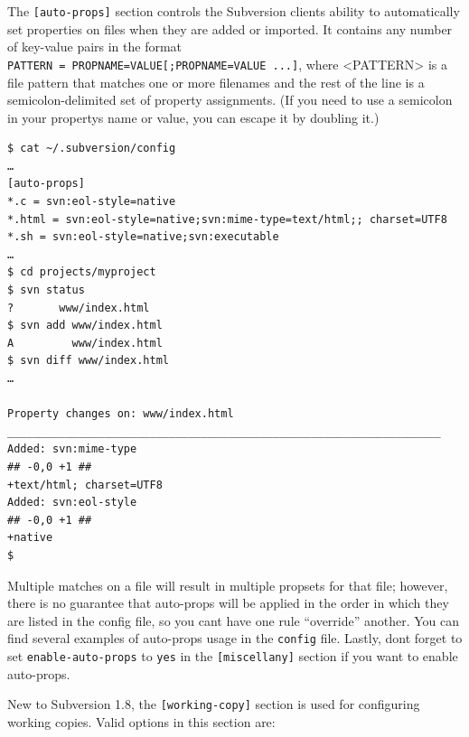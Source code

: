 The \texttt{{[}auto-props{]}} section controls the Subversion
client\textquotesingle s ability to automatically set properties on
files when they are added or imported. It contains any number of
key-value pairs in the format
\texttt{PATTERN\ =\ PROPNAME=VALUE{[};PROPNAME=VALUE\ ...{]}}, where
\textless PATTERN\textgreater{} is a file pattern that matches one or
more filenames and the rest of the line is a semicolon-delimited set of
property assignments. (If you need to use a semicolon in your
property\textquotesingle s name or value, you can escape it by doubling
it.)

\begin{verbatim}
$ cat ~/.subversion/config
…
[auto-props]
*.c = svn:eol-style=native
*.html = svn:eol-style=native;svn:mime-type=text/html;; charset=UTF8
*.sh = svn:eol-style=native;svn:executable
…
$ cd projects/myproject
$ svn status
?       www/index.html
$ svn add www/index.html
A         www/index.html
$ svn diff www/index.html
…

Property changes on: www/index.html
___________________________________________________________________
Added: svn:mime-type
## -0,0 +1 ##
+text/html; charset=UTF8
Added: svn:eol-style
## -0,0 +1 ##
+native
$
\end{verbatim}

Multiple matches on a file will result in multiple propsets for that
file; however, there is no guarantee that auto-props will be applied in
the order in which they are listed in the config file, so you
can\textquotesingle t have one rule ``override'' another. You can find
several examples of auto-props usage in the \texttt{config} file.
Lastly, don\textquotesingle t forget to set \texttt{enable-auto-props}
to \texttt{yes} in the \texttt{{[}miscellany{]}} section if you want to
enable auto-props.

New to Subversion 1.8, the \texttt{{[}working-copy{]}} section is used
for configuring working copies. Valid options in this section are:

